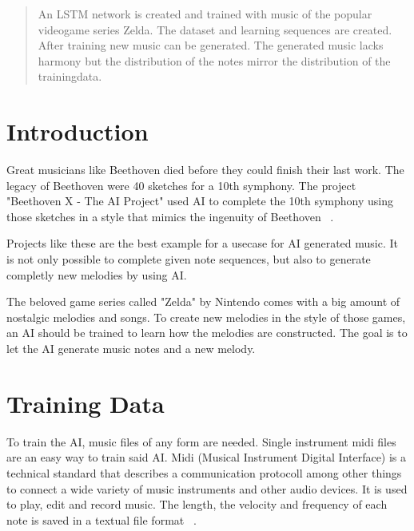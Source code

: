 \maketitle

\begin{abstract}
An LSTM network is created and trained with music of the popular videogame series Zelda.
The dataset and learning sequences are created. After training new music can be generated.
The generated music lacks harmony but the distribution of the notes mirror the distribution
of the trainingdata.

\end{abstract}

\section{Introduction}
\label{intro}

Great musicians like Beethoven died before they could finish their last work. The legacy
of Beethoven were 40 sketches for a 10th symphony. The project "Beethoven X - The AI 
Project" used AI to complete the 10th symphony using those sketches in a style that
mimics the ingenuity of Beethoven ~\cite{abc}.

Projects like these are the best example for a usecase for AI generated music. It is not
only possible to complete given note sequences, but also to generate completly new 
melodies by using AI.

The beloved game series called "Zelda" by Nintendo comes with a big amount of nostalgic
melodies and songs. To create new melodies in the style of those games, an AI should be
trained to learn how the melodies are constructed. The goal is to let the AI generate
music notes and a new melody.

\section{Training Data}
\label{trainingdata}

To train the AI, music files of any form are needed. Single instrument
midi files are an easy way to train said AI. Midi (Musical Instrument Digital
Interface) is a technical standard that describes a communication protocoll
among other things to connect a wide variety of music instruments and other
audio devices. It is used to play, edit and record music. The length, the
velocity and frequency of each note is saved in a textual file format ~\cite{wreglesworth_beginners_nodate}.

